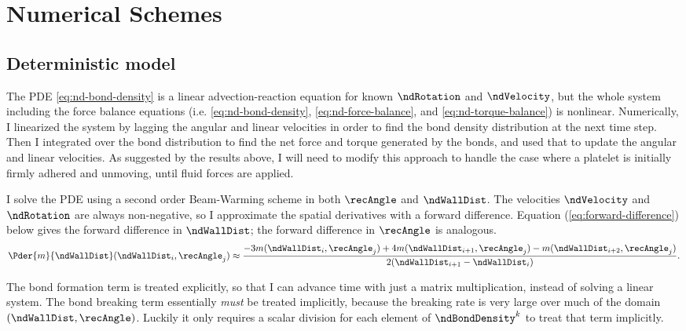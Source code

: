 
\chapter{Numerical Schemes}
\label{cha:numerical-schemes}

\section{Deterministic model}
\label{sec:deterministic-model}

The PDE \eqref{eq:nd-bond-density} is a linear advection-reaction
equation for known $\ndRotation$ and $\ndVelocity$, but the whole
system including the force balance equations
(i.e. \eqref{eq:nd-bond-density}, \eqref{eq:nd-force-balance}, and
\eqref{eq:nd-torque-balance}) is nonlinear. Numerically, I linearized
the system by lagging the angular and linear velocities in order to
find the bond density distribution at the next time step. Then I
integrated over the bond distribution to find the net force and torque
generated by the bonds, and used that to update the angular and linear
velocities. As suggested by the results above, I will need to modify
this approach to handle the case where a platelet is initially firmly
adhered and unmoving, until fluid forces are applied.

I solve the PDE using a second order Beam-Warming scheme in both
$\recAngle$ and $\ndWallDist$. The velocities $\ndVelocity$ and
$\ndRotation$ are always non-negative, so I approximate the spatial
derivatives with a forward difference. Equation
(\ref{eq:forward-difference}) below gives the forward difference in
$\ndWallDist$; the forward difference in $\recAngle$ is analogous.
\begin{equation}
  \label{eq:forward-difference}
  \Pder{m}{\ndWallDist}(\ndWallDist_i, \recAngle_j) \approx
  \frac{-3m(\ndWallDist_i, \recAngle_j) + 4m(\ndWallDist_{i+1},
    \recAngle_j) - m(\ndWallDist_{i+2},
    \recAngle_j)}{2(\ndWallDist_{i+1} - \ndWallDist_i)}.
\end{equation}

The bond formation term is treated explicitly, so that I can advance
time with just a matrix multiplication, instead of solving a linear
system. The bond breaking term essentially \emph{must} be treated
implicitly, because the breaking rate is very large over much of the
domain $(\ndWallDist, \recAngle)$. Luckily it only requires a scalar
division for each element of $\ndBondDensity^k$ to treat that term
implicitly.


